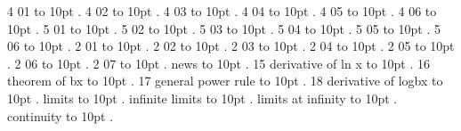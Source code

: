 
\pdfpagewidth=148mm
\pdfpageheight=210mm
\hsize=128mm
\vsize=190mm

\pdfhorigin=0pt
\pdfvorigin=0pt
\hoffset=10mm
\voffset=10mm
 4 01 \leaders\hbox to 10pt {\hss.\hss}  \hfill {}
\smallskip
{} 4 02 \leaders\hbox to 10pt {\hss.\hss}  \hfill {}
\smallskip
{} 4 03 \leaders\hbox to 10pt {\hss.\hss}  \hfill {}
\smallskip
{} 4 04 \leaders\hbox to 10pt {\hss.\hss}  \hfill {}
\smallskip
{} 4 05 \leaders\hbox to 10pt {\hss.\hss}  \hfill {}
\smallskip
{} 4 06 \leaders\hbox to 10pt {\hss.\hss}  \hfill {}
\smallskip
{} 5 01 \leaders\hbox to 10pt {\hss.\hss}  \hfill {}
\smallskip
{} 5 02 \leaders\hbox to 10pt {\hss.\hss}  \hfill {}
\smallskip
{} 5 03 \leaders\hbox to 10pt {\hss.\hss}  \hfill {}
\smallskip
{} 5 04 \leaders\hbox to 10pt {\hss.\hss}  \hfill {}
\smallskip
{} 5 05 \leaders\hbox to 10pt {\hss.\hss}  \hfill {}
\smallskip
{} 5 06 \leaders\hbox to 10pt {\hss.\hss}  \hfill {}
\smallskip
{} 2 01 \leaders\hbox to 10pt {\hss.\hss}  \hfill {}
\smallskip
{} 2 02 \leaders\hbox to 10pt {\hss.\hss}  \hfill {}
\smallskip
{} 2 03 \leaders\hbox to 10pt {\hss.\hss}  \hfill {}
\smallskip
{} 2 04 \leaders\hbox to 10pt {\hss.\hss}  \hfill {}
\smallskip
{} 2 05 \leaders\hbox to 10pt {\hss.\hss}  \hfill {}
\smallskip
{} 2 06 \leaders\hbox to 10pt {\hss.\hss}  \hfill {}
\smallskip
{} 2 07 \leaders\hbox to 10pt {\hss.\hss}  \hfill {}
\smallskip
\noindent news \leaders\hbox to 10pt {\hss.\hss}  \hfill {}
\smallskip
{} 15 derivative of ln x \leaders\hbox to 10pt {\hss.\hss}  \hfill {}
\smallskip
{} 16 theorem of bx \leaders\hbox to 10pt {\hss.\hss}  \hfill {}
\smallskip
{} 17 general power rule \leaders\hbox to 10pt {\hss.\hss}  \hfill {}
\smallskip
{} 18 derivative of logbx \leaders\hbox to 10pt {\hss.\hss}  \hfill {}
\smallskip
{} limits \leaders\hbox to 10pt {\hss.\hss}  \hfill {}
\smallskip
{} infinite limits \leaders\hbox to 10pt {\hss.\hss}  \hfill {}
\smallskip
{} limits at infinity \leaders\hbox to 10pt {\hss.\hss}  \hfill {}
\smallskip
{} continuity \leaders\hbox to 10pt {\hss.\hss}  \hfill {}
